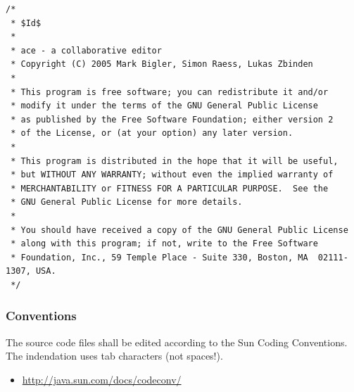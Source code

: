 \documentclass[11pt,a4paper]{article}
\begin{document}
\small{
\begin{verbatim}
/*
 * $Id$
 *
 * ace - a collaborative editor
 * Copyright (C) 2005 Mark Bigler, Simon Raess, Lukas Zbinden
 *
 * This program is free software; you can redistribute it and/or
 * modify it under the terms of the GNU General Public License
 * as published by the Free Software Foundation; either version 2
 * of the License, or (at your option) any later version.
 *
 * This program is distributed in the hope that it will be useful,
 * but WITHOUT ANY WARRANTY; without even the implied warranty of
 * MERCHANTABILITY or FITNESS FOR A PARTICULAR PURPOSE.  See the
 * GNU General Public License for more details.
 *
 * You should have received a copy of the GNU General Public License
 * along with this program; if not, write to the Free Software
 * Foundation, Inc., 59 Temple Place - Suite 330, Boston, MA  02111-1307, USA.
 */
\end{verbatim}
}

\subsubsection*{Conventions}
The source code files shall be edited according to the Sun Coding 
Conventions. The indendation uses tab characters (not spaces!).
\begin{itemize}
 \item \href{http://java.sun.com/docs/codeconv/}{http://java.sun.com/docs/codeconv/}
\end{itemize}
\end{document}
